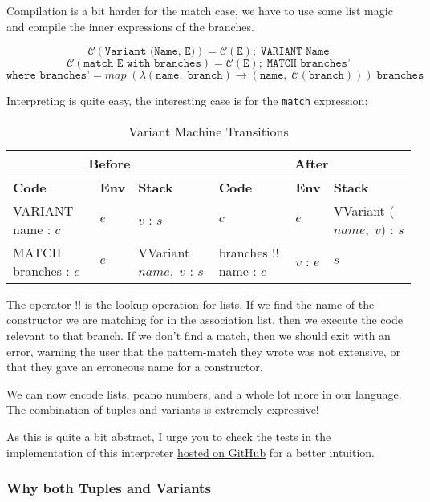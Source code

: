 Compilation is a bit harder for the match case, 
we have to use some list magic and compile the inner expressions of the branches.

\[ \mathcal{C}(\texttt{Variant (Name, E)}) = \mathcal{C}(\texttt{E});\; \texttt{VARIANT Name} \]
\[ \mathcal{C}(\texttt{match E with branches}) = \mathcal{C}(\texttt{E});\; \texttt{MATCH branches'} \]
\[  \texttt{where branches'} = map\; (\lambda (\texttt{name},\; \texttt{branch}) \to (\texttt{name},\; \mathcal{C}(\texttt{branch})))\; \texttt{branches} \]

Interpreting is quite easy, the interesting case is for the \texttt{match} expression:

\begin{table}[h]
    \centering
    \footnotesize
    \begin{tabular}{|l|l|l||l|l|l|}
        \hline
        \multicolumn{3}{|c||}{\textbf{Before}} & \multicolumn{3}{c|}{\textbf{After}} \\
        \hline
        \textbf{Code} & \textbf{Env} & \textbf{Stack} & \textbf{Code} & \textbf{Env} & \textbf{Stack} \\
        \hline
        VARIANT name : \(c\) & \( e \) & \( v \) : \( s \) & \( c \) & \( e \) & VVariant (\( name,\; v \)) : \( s \) \\
        MATCH branches : \(c\) & \( e \) & VVariant \( name,\; v \) : \( s \) & branches \( !! \) name : \( c \) & \( v \) : \( e \) & \( s \) \\
        \hline
    \end{tabular}
    \caption{Variant Machine Transitions}
\end{table}

The operator \( !! \) is the lookup operation for lists. If we find the name of the constructor 
we are matching for in the association list, then we execute the code relevant to that branch.
If we don't find a match, then we should exit with an error, warning the user that the pattern-match they wrote was 
not extensive, or that they gave an erroneous name for a constructor.

We can now encode lists, peano numbers, and a whole lot more in our language. The combination of tuples and variants
is extremely expressive!

As this is quite a bit abstract, I urge you to check the tests in the implementation of this interpreter \href{https://github.com/zazedd/secd/blob/main/src/Modern.hs}{hosted on GitHub} for a better intuition.

\subsubsection{Why both Tuples and Variants}

